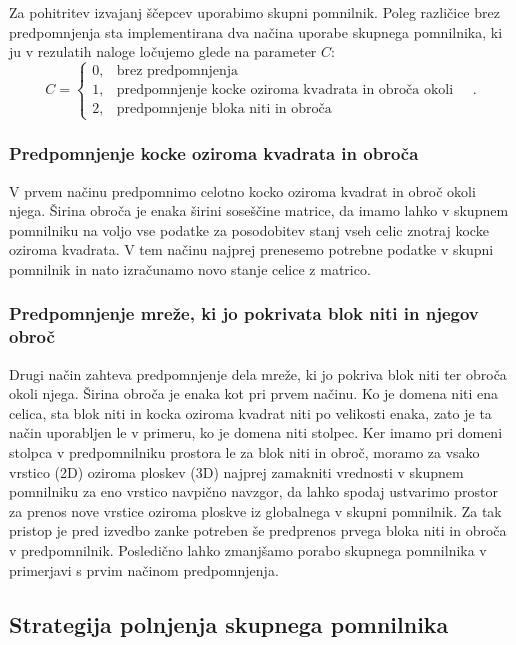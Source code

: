 \documentclass[a4paper, 12pt, openright]{book}
\begin{document}
Za pohitritev izvajanj ščepcev uporabimo skupni pomnilnik.
Poleg različice brez predpomnjenja sta implementirana dva načina uporabe skupnega pomnilnika, ki ju v rezulatih naloge ločujemo glede na parameter \(C\):
\begin{displaymath}
    C = \begin{cases}
        0, & \text{brez predpomnjenja} \\
        1, & \text{predpomnjenje kocke oziroma kvadrata in obroča okoli} \\
        2, & \text{predpomnjenje bloka niti in obroča}
    \end{cases}\quad.
\end{displaymath}

\subsubsection{Predpomnjenje kocke oziroma kvadrata in obroča}

V prvem načinu predpomnimo celotno kocko oziroma kvadrat in obroč okoli njega.
Širina obroča je enaka širini soseščine matrice, da imamo lahko v skupnem pomnilniku na voljo vse podatke za posodobitev stanj vseh celic znotraj kocke oziroma kvadrata.
V tem načinu najprej prenesemo potrebne podatke v skupni pomnilnik in nato izračunamo novo stanje celice z matrico.

\subsubsection{Predpomnjenje mreže, ki jo pokrivata blok niti in njegov obroč}

Drugi način zahteva predpomnjenje dela mreže, ki jo pokriva blok niti ter obroča okoli njega.
Širina obroča je enaka kot pri prvem načinu. Ko je domena niti ena celica, sta blok niti in kocka oziroma kvadrat niti po velikosti enaka, zato je ta način uporabljen le v primeru, ko je domena niti stolpec.
Ker imamo pri domeni stolpca v predpomnilniku prostora le za blok niti in obroč, moramo za vsako vrstico (2D) oziroma ploskev (3D) najprej zamakniti vrednosti v skupnem pomnilniku za eno vrstico navpično navzgor, da lahko spodaj ustvarimo prostor za prenos nove vrstice oziroma ploskve iz globalnega v skupni pomnilnik. Za tak pristop je pred izvedbo zanke potreben še predprenos prvega bloka niti in obroča v predpomnilnik.
Posledično lahko zmanjšamo porabo skupnega pomnilnika v primerjavi s prvim načinom predpomnjenja.

\subsection{Strategija polnjenja skupnega pomnilnika}
\end{document}
